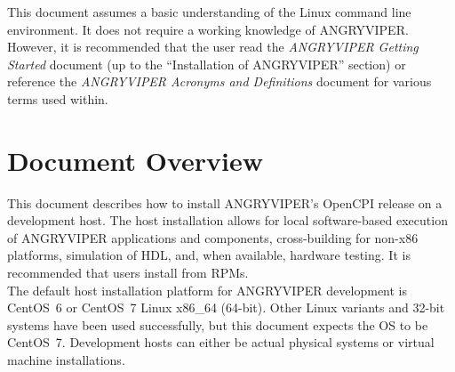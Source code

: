 This document assumes a basic understanding of the Linux command line environment. It does not require a working knowledge of ANGRYVIPER. However, it is recommended that the user read the \textit{ANGRYVIPER Getting Started} document (up to the ``Installation of ANGRYVIPER'' section) or reference the \textit{ANGRYVIPER Acronyms and Definitions} document for various terms used within.
\def\refskipig{} %
\def\myreferences{
\hline
Installation Guide\footnote{The installation process for ANGRYVIPER is very different, but the OpenCPI Installation Guide has applicable post-installation information for PCI-based boards, etc.}
& OpenCPI & \url{https://goo.gl/VWo2jX} \\
\hline
Component Development Guide & OpenCPI & \url{https://goo.gl/zBwIe0} \\
\hline
RCC Development Guide & OpenCPI & \url{https://goo.gl/0ix1E0} \\
\hline
HDL Development Guide & OpenCPI & \url{https://goo.gl/OVmRhI} \\
\hline
FPGA Vendor Tools Installation Guide & ANGRYVIPER & \path{AngryViper_FPGA_Vendor_Tools_Installation_Guide.pdf} \\
\hline
Managing Software with \texttt{yum} & CentOS Project &  \url{https://www.centos.org/docs/5/html/yum/} \\
\hline
CentOS Deployment Guide: Useful \texttt{yum} commands (\textit{e.g.} \texttt{yum localinstall}) & CentOS Project &  \url{https://www.centos.org/docs/5/html/5.2/Deployment_Guide/s1-yum-useful-commands.html} \\
}

\newpage
\section{Document Overview}
\label{sec:doc_overview}
This document describes how to install ANGRYVIPER's OpenCPI release on a development host. The host installation allows for local software-based execution of ANGRYVIPER applications and components, cross-building for non-x86 platforms, simulation of HDL, and, when available, hardware testing. It is recommended that users install from RPMs.\\

The default host installation platform for ANGRYVIPER development is CentOS~6 or CentOS~7 Linux x86\_64 (64-bit). Other Linux variants and 32-bit systems have been used successfully, but this document expects the OS to be CentOS~7. Development hosts can either be actual physical systems or virtual machine installations.\\

